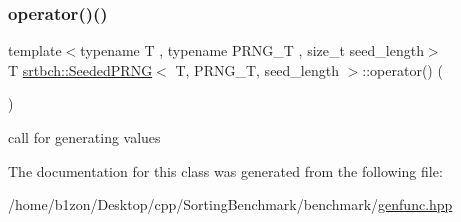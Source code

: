 \subsubsection{\texorpdfstring{operator()()}{operator()()}}
{\footnotesize\ttfamily template$<$typename T , typename P\+R\+N\+G\+\_\+T , size\+\_\+t seed\+\_\+length$>$ \\
T \hyperlink{classsrtbch_1_1SeededPRNG}{srtbch\+::\+Seeded\+P\+R\+NG}$<$ T, P\+R\+N\+G\+\_\+T, seed\+\_\+length $>$\+::operator() (\begin{DoxyParamCaption}{ }\end{DoxyParamCaption})\hspace{0.3cm}{\ttfamily [inline]}}

call for generating values 

The documentation for this class was generated from the following file\+:\begin{DoxyCompactItemize}
\item 
/home/b1zon/\+Desktop/cpp/\+Sorting\+Benchmark/benchmark/\hyperlink{genfunc_8hpp}{genfunc.\+hpp}\end{DoxyCompactItemize}
